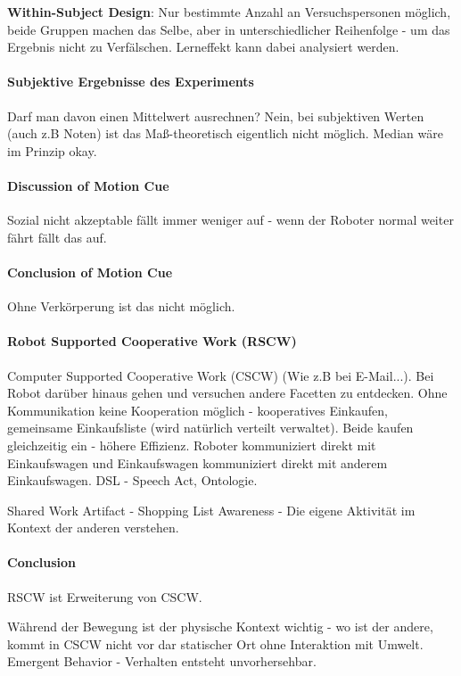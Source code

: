\textbf{Within-Subject Design}: Nur bestimmte Anzahl an Versuchspersonen möglich,
beide Gruppen machen das Selbe, aber in unterschiedlicher Reihenfolge - um das Ergebnis
nicht zu Verfälschen. Lerneffekt kann dabei analysiert werden.

\paragraph{Subjektive Ergebnisse des Experiments}
Darf man davon einen Mittelwert ausrechnen? Nein, bei subjektiven Werten (auch z.B Noten)
ist das Maß-theoretisch eigentlich nicht möglich. 
Median wäre im Prinzip okay.

\paragraph{Discussion of Motion Cue}
Sozial nicht akzeptable fällt immer weniger auf - wenn der Roboter normal weiter fährt
fällt das auf. 
\paragraph{Conclusion of Motion Cue}
Ohne Verkörperung ist das nicht möglich. 

\paragraph {Robot Supported Cooperative Work (RSCW)}
Computer Supported Cooperative Work (CSCW) (Wie z.B bei E-Mail...).
Bei Robot darüber hinaus gehen und versuchen andere Facetten zu entdecken. 
Ohne Kommunikation keine Kooperation möglich - kooperatives Einkaufen, gemeinsame
Einkaufsliste (wird natürlich verteilt verwaltet). Beide kaufen gleichzeitig ein -
höhere Effizienz. 
Roboter kommuniziert direkt mit Einkaufswagen und Einkaufswagen kommuniziert direkt mit
anderem Einkaufswagen. DSL - Speech Act, Ontologie.

Shared Work Artifact - Shopping List
Awareness - Die eigene Aktivität im Kontext der anderen verstehen.

\paragraph{Conclusion}

RSCW ist Erweiterung von CSCW.

Während der Bewegung ist der physische Kontext wichtig - wo ist der andere, kommt in CSCW
nicht vor dar statischer Ort ohne Interaktion mit Umwelt.
Emergent Behavior - Verhalten entsteht unvorhersehbar.

